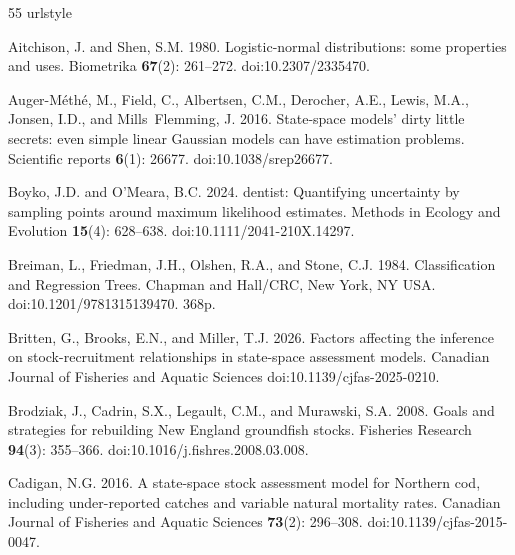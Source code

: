 \documentclass[
  12pt,
]{article}
\begin{document}
\begin{thebibliography}{55}
\providecommand{\natexlab}[1]{#1}
\expandafter\ifx\csname urlstyle\endcsname\relax
  \providecommand{\doi}[1]{doi:\discretionary{}{}{}#1}\else
  \providecommand{\doi}{doi:\discretionary{}{}{}\begingroup \urlstyle{rm}\Url}\fi

Aitchison, J. and Shen, S.M. 1980.
\newblock Logistic-normal distributions: some properties and uses.
\newblock Biometrika \textbf{67}(2): 261--272.
\newblock \doi{10.2307/2335470}.

Auger-M{\'e}th{\'e}, M., Field, C., Albertsen, C.M., Derocher, A.E., Lewis, M.A., Jonsen, I.D., and Mills~Flemming, J. 2016.
\newblock State-space models' dirty little secrets: even simple linear {G}aussian models can have estimation problems.
\newblock Scientific reports \textbf{6}(1): 26677.
\newblock \doi{10.1038/srep26677}.

Boyko, J.D. and {O'Meara}, B.C. 2024.
\newblock dentist: Quantifying uncertainty by sampling points around maximum likelihood estimates.
\newblock Methods in Ecology and Evolution \textbf{15}(4): 628--638.
\newblock \doi{10.1111/2041-210X.14297}.

Breiman, L., Friedman, J.H., Olshen, R.A., and Stone, C.J. 1984.
\newblock Classification and Regression Trees.
\newblock Chapman and Hall/CRC, New York, NY USA.
\newblock \doi{10.1201/9781315139470}.
\newblock 368p.

Britten, G., Brooks, E.N., and Miller, T.J. 2026.
\newblock Factors affecting the inference on stock-recruitment relationships in state-space assessment models.
\newblock Canadian Journal of Fisheries and Aquatic Sciences \doi{10.1139/cjfas-2025-0210}.

Brodziak, J., Cadrin, S.X., Legault, C.M., and Murawski, S.A. 2008.
\newblock Goals and strategies for rebuilding {N}ew {E}ngland groundfish stocks.
\newblock Fisheries Research \textbf{94}(3): 355--366.
\newblock \doi{10.1016/j.fishres.2008.03.008}.

Cadigan, N.G. 2016.
\newblock A state-space stock assessment model for {N}orthern cod, including under-reported catches and variable natural mortality rates.
\newblock Canadian Journal of Fisheries and Aquatic Sciences \textbf{73}(2): 296--308.
\newblock \doi{10.1139/cjfas-2015-0047}.


\end{thebibliography}
\end{document}
